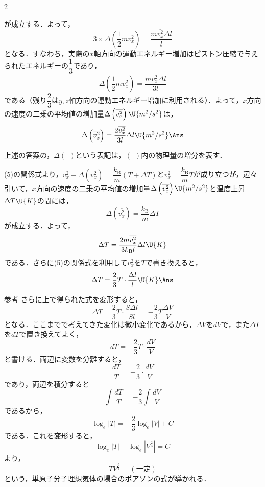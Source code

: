 \begin{multicols}{2}
\begin{komon}
       が成立する．よって，
       \[3\times\Delta\left(\frac{1}{2}m\overline{v_x^2}\right)=\frac{m\overline{v_x^2}\Delta l}{l}\]
       となる．すなわち，実際の$x$軸方向の運動エネルギー増加はピストン圧縮で与えられたエネルギーの$\dfrac{1}{3}$であり，
       \[\Delta\left(\frac{1}{2}m\overline{v_x^2}\right)=\frac{m\overline{v_x^2}\Delta l}{3l}\]
       である（残り$\dfrac{2}{3}$は$y, z$軸方向の運動エネルギー増加に利用される）．よって，$x$方向の速度の二乗の平均値の増加量$\Delta\left(\overline{v_x^2}\right)\U{m^2/s^2}$は，
       \[\Delta\left(\overline{v_x^2}\right)=\frac{2\overline{v_x^2}}{3l}\Delta l\U{m^2/s^2}\Ans\]
\end{komon}
\begin{chuu}
上述の答案の，$\Delta(\ \ )$という表記は，$(\ \ )$内の物理量の増分を表す．
\end{chuu}
\begin{komon}
 (5)の関係式より，$\overline{v_x^2}+\Delta\left(\overline{v_x^2}\right)=\dfrac{k_{\mathrm{B}}}{m}(T+\Delta T)$と$\overline{v_x^2}=\dfrac{k_{\mathrm{B}}}{m}T$が成り立つが，辺々引いて，$x$方向の速度の二乗の平均値の増加量$\Delta\left(\overline{v_x^2}\right)\U{m^2/s^2}$と温度上昇$\Delta T\U{K}$の間には，
       \[\Delta\left(\overline{v_x^2}\right)=\frac{k_{\mathrm{B}}}{m}\Delta T\]
       が成立する．よって，
       \[\Delta T=\frac{2m\overline{v_x^2}}{3k_{\mathrm{B}}l}\Delta l\U{K}\]
       である．さらに(5)の関係式を利用して$\overline{v_x^2}$を$T$で書き換えると，
       \[\Delta T=\frac{2}{3}T\cdot\frac{\Delta l}{l}\U{K}\Ans\]
\end{komon}
\begin{bsHosoku}{参考}
さらに上で得られた式を変形すると，
\[\Delta T=\frac{2}{3}T\cdot\frac{S\Delta l}{Sl}=-\frac{2}{3}T\frac{\Delta V}{V}\]
となる．ここまでで考えてきた変化は微小変化であるから，$\Delta V$を$dV$で，また$\Delta T$を$dT$で置き換えてよく，
\[dT=-\frac{2}{3}T\cdot\frac{dV}{V}\]
と書ける．両辺に変数を分離すると，
\[\frac{dT}{T}=-\frac{2}{3}\cdot\frac{dV}{V}\]
であり，両辺を積分すると
\[\int\frac{dT}{T}=-\frac{2}{3}\int\frac{dV}{V}\]
であるから，
\[\log_e|T|=-\frac{2}{3}\log_e|V|+C\]
である．これを変形すると，
\[\log_e|T|+\log_e\left|V^{\frac{2}{3}}\right|=C\]
より，
\[TV^{\frac{2}{3}}=(\text{一定})\]
という，単原子分子理想気体の場合のポアソンの式が導かれる．
\end{bsHosoku}

\end{multicols}
